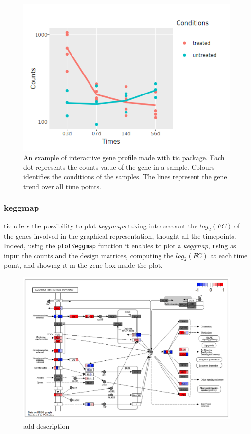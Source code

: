 \begin{figure}[H]
\includegraphics[width=\textwidth,height=\textheight,keepaspectratio]{img/ticorser/gene_trend.png}
\caption[ticorser gene profile]{An example of interactive gene profile made with \gls{tic} package. Each dot represents the counts value of the gene in a sample. Colours identifies the conditions of the samples. The lines represent the gene trend over all time points.}
\label{fig:ticorsergenetrend}
\centering
\end{figure}

\subsubsection{keggmap}
\gls{tic} offers the possibility to plot \textit{keggmaps}\cite{Kanehisa2016} taking into account the $log_2(FC)$ of the genes involved in the graphical representation, thought all the timepoints.
Indeed, using the \lstinline!plotKeggmap! function it enables to plot a \textit{keggmap}, using as input the counts and the design matrices, computing the $log_2(FC)$ at each time point, and showing it in the gene box inside the plot.

\begin{figure}[H]
\includegraphics[width=\textwidth,height=\textheight,keepaspectratio]{img/ticorser/keggmap_example.png}
\caption[ticorser keggmap]{add description}
\label{fig:ticorserkeggmap}
\centering
\end{figure}








